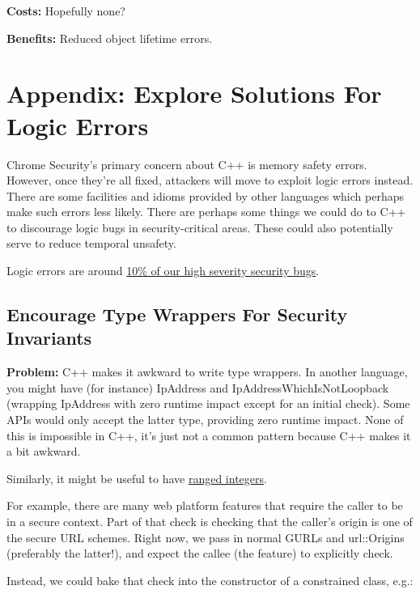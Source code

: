 \documentclass[a4paper,12pt,notitlepage,twoside,openright]{article}
\newcommand{\uline}[1]{#1}
\begin{document}
{\textbf{Costs:} Hopefully none?

\textbf{Benefits:} Reduced object lifetime errors.

\section{{Appendix: }Explore Solutions For Logic Errors}

Chrome Security's primary concern about C++ is memory safety errors.
However, once they're all fixed, attackers will move to exploit logic
errors instead. There are some facilities and idioms provided by other
languages which perhaps make such errors less likely. There are perhaps
some things we could do to C++ to discourage logic bugs in
security-critical areas. These could also potentially serve to reduce
temporal unsafety.

Logic errors are
around \href{https://docs.google.com/document/d/e/2PACX-1vRZr-HJcYmf2Y76DhewaiJOhRNpjGHCxliAQTBhFxzv1QTae9o8mhBmDl32CRIuaWZLt5kVeH9e9jXv/pub\#h.eoikp3r0cwlf}{\uline{10\%
of our high severity security bugs}}.

\subsection{Encourage Type Wrappers For Security Invariants}

\textbf{Problem:} C++ makes it awkward to write type wrappers. In
another language, you might have (for
instance) IpAddress and IpAddressWhichIsNotLoopback (wrapping IpAddress with
zero runtime impact except for an initial check). Some APIs would only
accept the latter type, providing zero runtime impact. None of this is
impossible in C++, it's just not a common pattern because C++ makes it a
bit awkward.

Similarly, it might be useful to
have \href{https://www.google.com/url?q=https://resources.sei.cmu.edu/asset_files/TechnicalNote/2007_004_001_14846.pdf\&sa=D\&source=editors\&ust=1631944129113000\&usg=AOvVaw3rHn2Q-m9cXLF3kGN-M1Hu}{\uline{ranged
integers}}.

For example, there are many web platform features that require the
caller to be in a secure context. Part of that check is checking that
the caller's origin is one of the secure URL schemes. Right now, we pass
in normal GURLs and url::Origins (preferably the latter!), and expect
the callee (the feature) to explicitly check.

Instead, we could bake that check into the constructor of a constrained
class, e.g.:

}
\end{document}
